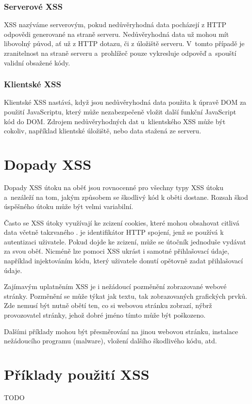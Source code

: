 \documentclass[11pt, conference, a4paper]{IEEEtran}
\begin{document}
\subsubsection{Serverové XSS}
XSS nazýváme serverovým, pokud nedůvěryhodná data pocházejí z HTTP odpovědi generované na straně serveru. Nedůvěryhodná data už mohou mít libovolný původ, ať už z HTTP dotazu, či z úložiště serveru. V~tomto případě je zranitelnost na straně serveru a~prohlížeč pouze vykresluje odpověď a~spouští validní obsažené kódy.


\subsubsection{Klientské XSS}
Klientské XSS nastává, když jsou nedůvěryhodná data použita k úpravě DOM za použití JavaScriptu, který může nezabezpečeně vložit další funkční JavaScript kód do DOM. Zdrojem nedůvěryhodných dat u~klientského XSS může být cokoliv, například klientské úložiště, nebo data stažená ze serveru.~\cite{TYPES-XSS-owasp}


\section{Dopady XSS}
Dopady XSS útoku na oběť jsou rovnocenné pro všechny typy XSS útoku a~nezáleží na tom, jakým způsobem se škodlivý kód k oběti dostane. Rozsah škod úspěšného útoku může být velmi variabilní.

Často se XSS útoky využívají ke zcizení cookies, které mohou obsahovat citlivá data včetně takzvaného .  je identifikátor HTTP spojení, jenž se používá k autentizaci uživatele. Pokud dojde ke zcizení, může se útočník jednoduše vydávat za svou oběť. Nicméně lze pomoci XSS ukrást i samotné přihlašovací údaje, například injektováním kódu, který uživatele donutí opětovně zadat přihlašovací údaje. 

Zajímavým uplatněním XSS je i nežádoucí pozměnění zobrazované webové stránky. Pozměnění se může týkat jak textu, tak zobrazovaných grafických prvků. Zde nemusí být nutně obětí ten, co si webovou stránku zobrazí, nýbrž provozovatel stránky, jehož dobré jméno tímto může být poškozeno. 

Dalšími příklady mohou být přesměrování na jinou webovou stránku, instalace nežádoucího programu \mbox{(malware)}, vložení dalšího škodlivého kódu, atd.


\section{Příklady použití XSS}
{\color{red}TODO}
\end{document}
